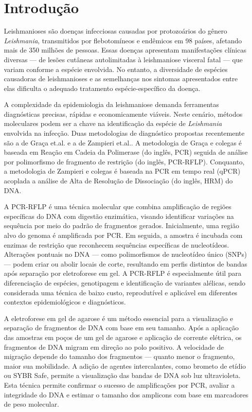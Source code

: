 \section{Introdução}

Leishmanioses são doenças infecciosas causadas por protozoários do gênero
\textit{Leishmania}, transmitidos por flebotomíneos e endêmicos em 98 países,
afetando mais de 350 milhões de pessoas\cite{hong2020one}. Essas doenças
apresentam manifestações clínicas diversas — de lesões cutâneas autolimitadas à
leishmaniose visceral fatal — que variam conforme a espécie envolvida. No
entanto, a diversidade de espécies causadoras de leishmanioses e as semelhanças
nos sintomas apresentados entre elas dificulta o adequado tratamento
espécie-específico da doença.

A complexidade da epidemiologia da leishmaniose demanda ferramentas diagnósticas
precisas, rápidas e economicamente viáveis.  Neste cenário, métodos moleculares
podem ser a chave na identificação da espécie de \textit{Leishmania} envolvida
na infecção. Duas metodologias de diagnóstico propostas recentemente são a de
Graça et.al.\cite{RFLPgraca2012} e a de Zampieri et.al.\cite{HRMzampi2016}.
A metodologia de Graça e colegas é baseada em Reação em Cadeia da Polimerase
(do inglês, PCR) seguida de análise por polimorfismo de fragmento de restrição
(do inglês, PCR-RFLP). Conquanto, a metodologia de Zampieri e colegas é baseada
na PCR em tempo real (qPCR) acoplada a análise de Alta de Resolução de
Dissociação (do inglês, HRM) do DNA. 

A PCR-RFLP é uma técnica molecular que combina amplificação de regiões 
específicas do DNA com digestão enzimática, visando identificar variações na sequência por meio do padrão de fragmentos gerados. Inicialmente, 
uma região alvo do genoma é amplificada por PCR. Em seguida, a amostra é incubada com enzimas de restrição que reconhecem sequências específicas 
de nucleotídeos. Alterações pontuais no DNA — como polimorfismos
de nucleotídeo único (SNPs) — podem criar ou abolir locais de corte, resultando em perfis distintos de bandas após separação 
por eletroforese em gel. A PCR-RFLP é especialmente útil para diferenciação de espécies, genotipagem e identificação de variantes alélicas, sendo 
considerada uma técnica de baixo custo, reprodutível e aplicável em diferentes contextos epidemiológicos e diagnósticos\cite{garcia2005metodos}.

A eletroforese em gel de agarose é um método essencial para a visualização e
separação de fragmentos de DNA com base em seu tamanho.  Após a aplicação das
amostras em poços de um gel de agarose e aplicação de corrente elétrica, os
fragmentos de DNA migram em direção ao polo positivo. A velocidade de migração
depende do tamanho dos fragmentos — quanto menor o fragmento, maior sua
mobilidade.  A adição de agentes intercalantes, como brometo de etídio ou SYBR
Safe, permite a visualização das bandas de DNA sob luz ultravioleta.  Esta
técnica permite confirmar o sucesso de amplificações por PCR, avaliar a
integridade do DNA e estimar o tamanho dos amplicons com base em marcadores de
peso molecular\cite{costa1998leishmaniose}.

